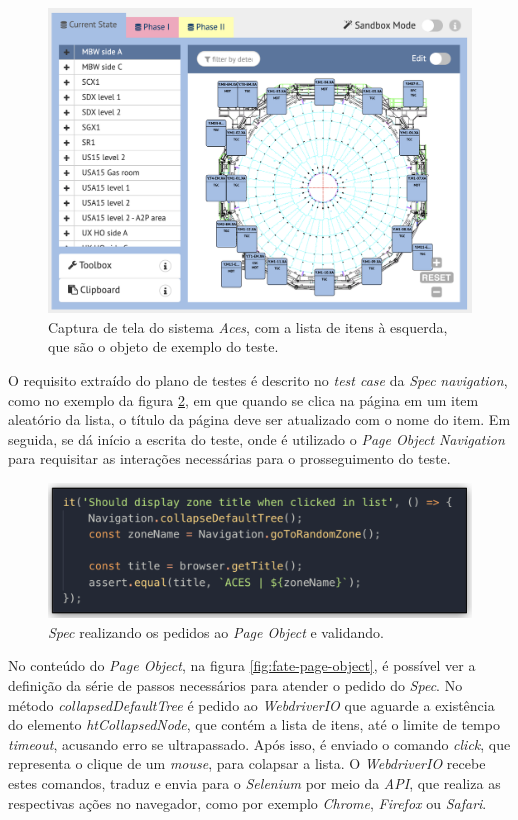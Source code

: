 \begin{figure}[H]
    \centering
    \includegraphics[width=11.75cm]{source/4-solucao/images/aces-example.png}
    \caption{Captura de tela do sistema \emph{Aces}, com a lista de itens à esquerda, que são o objeto de exemplo do teste.}
    \label{fig:aces-example}
\end{figure}

O requisito extraído do plano de testes é descrito no \emph{test case} da \emph{Spec} \emph{navigation}, como no exemplo da figura \ref{fig:fate-spec}, em que quando se clica na página em um item aleatório da lista, o título da página deve ser atualizado com o nome do item. Em seguida, se dá início a escrita do teste, onde é utilizado o \emph{Page Object} \emph{Navigation} para requisitar as interações necessárias para o prosseguimento do teste.

\begin{figure}[H]
    \centering
    \includegraphics[width=13cm]{source/4-solucao/images/fate-spec.png}
    \caption{\emph{Spec} realizando os pedidos ao \emph{Page Object} e validando.}
    \label{fig:fate-spec}
\end{figure}

No conteúdo do \emph{Page Object}, na figura \ref{fig:fate-page-object}, é possível ver a definição da série de passos necessários para atender o pedido do \emph{Spec}. No método \emph{collapsedDefaultTree} é pedido ao \emph{WebdriverIO} que aguarde a existência do elemento \emph{htCollapsedNode}, que contém a lista de itens, até o limite de tempo \emph{timeout}, acusando erro se ultrapassado. Após isso, é enviado o comando \emph{click}, que representa o clique de um \emph{mouse}, para colapsar a lista. O \emph{WebdriverIO} recebe estes comandos, traduz e envia para o \emph{Selenium} por meio da \emph{API}, que realiza as respectivas ações no navegador, como por exemplo \emph{Chrome}, \emph{Firefox} ou \emph{Safari}.

